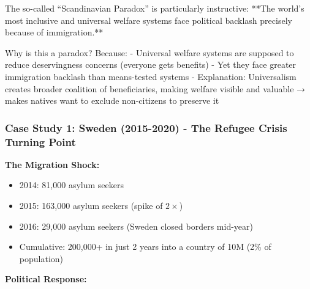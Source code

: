 The so-called ``Scandinavian Paradox'' is particularly instructive: **The world's most inclusive and universal welfare systems face political backlash precisely because of immigration.**

Why is this a paradox? Because:
- Universal welfare systems are supposed to reduce deservingness concerns (everyone gets benefits)
- Yet they face greater immigration backlash than means-tested systems
- Explanation: Universalism creates broader coalition of beneficiaries, making welfare visible and valuable → makes natives want to exclude non-citizens to preserve it

\subsubsection{Case Study 1: Sweden (2015-2020) - The Refugee Crisis Turning Point}

\textbf{The Migration Shock:}

\begin{itemize}[nosep]
\item 2014: 81,000 asylum seekers
\item 2015: 163,000 asylum seekers (spike of $2\times$)
\item 2016: 29,000 asylum seekers (Sweden closed borders mid-year)
\item Cumulative: 200,000+ in just 2 years into a country of 10M (2\% of population)
\end{itemize}

\textbf{Political Response:}

